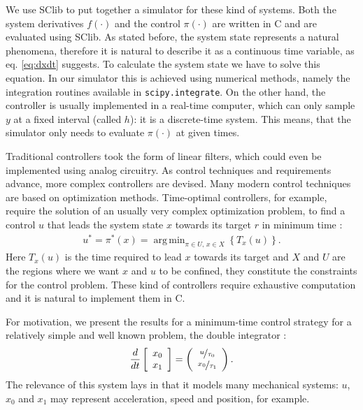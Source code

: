 \documentclass[10pt, a4paper, twocolumn]{article}
\DeclareMathOperator*{\argmin}{arg\,min}
\begin{document}
{We use SClib to put together a simulator for these kind of systems.  Both the
system derivatives $f(\cdot)$ and the control $\pi(\cdot)$ are written in C and
are evaluated using SClib. As stated before, the system state represents a
natural phenomena, therefore it is natural to describe it as a continuous time
variable, as eq. \eqref{eq:dxdt} suggests. To calculate the system state we
have to solve this equation. In our simulator this is achieved using numerical
methods, namely the integration routines available in \verb+scipy.integrate+. On
the other hand, the controller is usually implemented in a real-time computer,
which can only sample $y$ at a fixed interval (called $h$): it is a
discrete-time system.  This means, that the simulator only needs to evaluate
$\pi(\cdot)$ at given times.

Traditional controllers took the form of linear filters, which could even be
implemented using analog circuitry. As control techniques and requirements
advance, more complex controllers are devised. Many modern control techniques
are based on optimization methods. Time-optimal controllers, for example,
require the solution of an usually very complex optimization problem, to find a
control $u$ that leads the system state $x$ towards its target $r$ in minimum
time \cite{Gruene}:
\begin{align}\label{feedback}
u ^*= \pi^*(x)=\argmin_{\pi\in U,\, x\in X}\left\lbrace T_{x}(u)\right\rbrace.
\end{align}
Here $T_x(u)$ is the time required to lead $x$ towards its target and $X$ and
$U$ are the regions where we want $x$ and $u$ to be confined, they constitute
the constraints for the control problem.  These kind of controllers require
exhaustive computation and it is natural to implement them in C.

For motivation, we present the results for a minimum-time control strategy for
a relatively simple and well known problem, the double integrator
\cite{Fuentes2013}:
\begin{align}
    \frac{d}{dt}\left[ 
        \begin{array}{c}
            x_0\\
            x_1
        \end{array}
    \right]
    =
    \left( 
    \begin{array}{c}
        \nicefrac{u}{\tau_0}\\
        \nicefrac{x_0}{\tau_1}
    \end{array}
    \right).
    \label{eq:di}
\end{align}
The relevance of this system lays in that it models many mechanical systems:
$u$, $x_0$ and $x_1$ may represent acceleration, speed and position, for
example.

}
\end{document}

